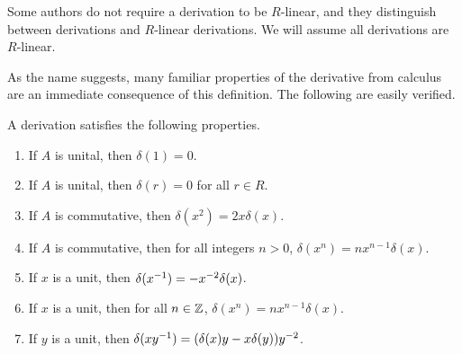 Some authors do not require a derivation to be $R$-linear,
and they distinguish between derivations and $R$-linear derivations.
We will assume all derivations are $R$-linear.

As the name suggests, many familiar properties of the derivative from calculus
are an immediate consequence of this definition.
The following are easily verified.
\begin{proposition}
  \label{prop_derivation}
  A derivation satisfies the following properties.
  \begin{enumerate}[label=(\roman*)]
    \item If $A$ is unital, then $\delta(1) = 0$.
    \item If $A$ is unital, then $\delta(r) = 0$ for all $r \in R$.
    \item If $A$ is commutative, then $\delta(x^2) = 2x\delta(x)$.
    \item If $A$ is commutative, then for all integers $n > 0$, $\delta(x^n) = nx^{n-1}\delta(x)$.
    \item If $x$ is a unit, then $\delta(x^{-1}) = -x^{-2}\delta(x)$.
    \item If $x$ is a unit, then for all $n \in \mathbb{Z}$, $\delta(x^n) = nx^{n-1}\delta(x)$.
    \item If $y$ is a unit, then $\delta(xy^{-1}) = (\delta(x)y - x\delta(y))y^{-2}$.
  \end{enumerate}
\end{proposition}

